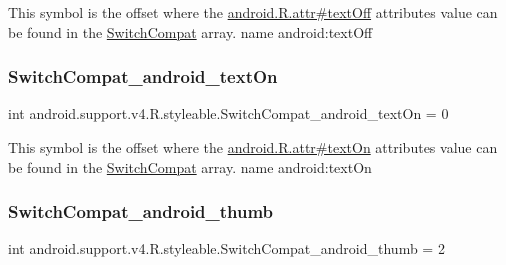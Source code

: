 This symbol is the offset where the \hyperlink{}{android.\+R.\+attr\#text\+Off} attribute\textquotesingle{}s value can be found in the \hyperlink{classandroid_1_1support_1_1v4_1_1R_1_1styleable_a3b46a9ea84acdcc1d9e88a54fc6f685e}{Switch\+Compat} array.  name android\+:text\+Off \mbox{\label{classandroid_1_1support_1_1v4_1_1R_1_1styleable_ab130695aad0fe2adc831a887079ac3cf}} 
\subsubsection{\texorpdfstring{Switch\+Compat\+\_\+android\+\_\+text\+On}{SwitchCompat\_android\_textOn}}
{\footnotesize\ttfamily int android.\+support.\+v4.\+R.\+styleable.\+Switch\+Compat\+\_\+android\+\_\+text\+On = 0\hspace{0.3cm}{\ttfamily [static]}}

This symbol is the offset where the \hyperlink{}{android.\+R.\+attr\#text\+On} attribute\textquotesingle{}s value can be found in the \hyperlink{classandroid_1_1support_1_1v4_1_1R_1_1styleable_a3b46a9ea84acdcc1d9e88a54fc6f685e}{Switch\+Compat} array.  name android\+:text\+On \mbox{\label{classandroid_1_1support_1_1v4_1_1R_1_1styleable_a3e61ded8a9be801503c52b0b981e60ef}} 
\subsubsection{\texorpdfstring{Switch\+Compat\+\_\+android\+\_\+thumb}{SwitchCompat\_android\_thumb}}
{\footnotesize\ttfamily int android.\+support.\+v4.\+R.\+styleable.\+Switch\+Compat\+\_\+android\+\_\+thumb = 2\hspace{0.3cm}{\ttfamily [static]}}

